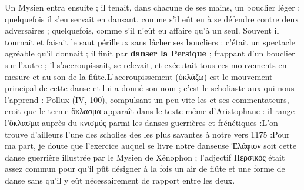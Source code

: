 {{Un Mysien entra ensuite ; il tenait, dans chacune de ses mains, un bouclier léger ; quelquefois il s'en servait en dansant, comme s'il eût eu à se défendre contre deux adversaires ; quelquefois, comme s'il n'eût eu affaire qu'à un seul. Souvent il tournait et faisait le saut périlleux sans lâcher ses boucliers : c'était un spectacle agréable qu'il donnait ; il finit par \textbf{danser la Persique} ; frappant d'un bouclier sur l'autre ; il s'accroupissait, se relevait, et exécutait tous ces mouvements en mesure et au son de la flûte.}L'accroupissement (ὀκλάζω) est le mouvement principal de cette danse et lui a donné son nom ; c'est le scholiaste aux  qui nous l'apprend : Pollux (IV, 100), compulsant un peu vite les  et ses commentateurs, croit que le terme ὄκλασμα apparaît dans le texte-même d'Aristophane : il range l'ὄκλασμα auprès du κνισμός parmi les danses guerrières et frénétiques :L'on trouve d'ailleurs l'une des scholies des  les plus savantes à notre vers 1175 :Pour ma part, je doute que l'exercice auquel se livre notre danseuse Ἐλάφιον soit cette danse guerrière illustrée par le Mysien de Xénophon ; l'adjectif Περσικός était assez commun pour qu'il pût désigner à la fois un air de flûte et une forme de danse sans qu'il y eût nécessairement de rapport entre les deux.}
